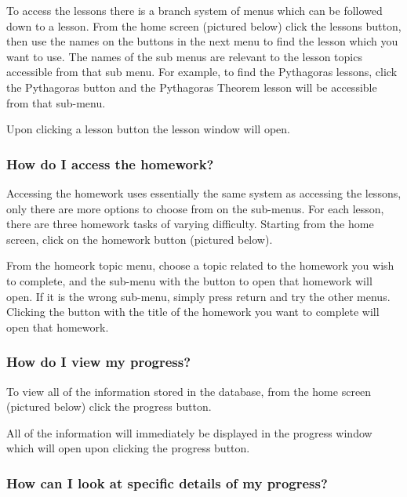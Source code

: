 To access the lessons there is a branch system of menus which can be followed down to a lesson. From the home screen (pictured below) click the lessons button, then use the names on the buttons in the next menu to find the lesson which you want to use. The names of the sub menus are relevant to the lesson topics accessible from that sub menu. For example, to find the Pythagoras lessons, click the Pythagoras button and the Pythagoras Theorem lesson will be accessible from that sub-menu.


Upon clicking a lesson button the lesson window will open.


\subsubsection{How do I access the homework?}

Accessing the homework uses essentially the same system as accessing the lessons, only there are more options to choose from on the sub-menus. For each lesson, there are three homework tasks of varying difficulty. Starting from the home screen, click on the homework button (pictured below).


From the homeork topic menu, choose a topic related to the homework you wish to complete, and the sub-menu with the button to open that homework will open. If it is the wrong sub-menu, simply press return and try the other menus. Clicking the button with the title of the homework you want to complete will open that homework.


\subsubsection{How do I view my progress?}

To view all of the information stored in the database, from the home screen (pictured below) click the progress button.


All of the information will immediately be displayed in the progress window which will open upon clicking the progress button.


\subsubsection{How can I look at specific details of my progress?}

